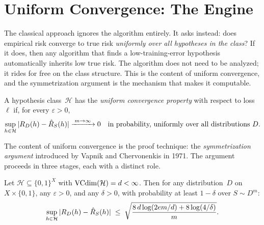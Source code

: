 
\section{Uniform Convergence: The Engine}
\label{sec:uniform-convergence}

The classical approach ignores the algorithm entirely. It asks instead: does empirical risk converge to true risk \emph{uniformly over all hypotheses in the class}? If it does, then any algorithm that finds a low-training-error hypothesis automatically inherits low true risk. The algorithm does not need to be analyzed; it rides for free on the class structure. This is the content of uniform convergence, and the symmetrization argument is the mechanism that makes it computable.

\begin{defn}
\label{def:uniform-convergence}
A hypothesis class~$\mathcal{H}$ has the \emph{uniform convergence
property} with respect to loss~$\ell$ if, for every $\varepsilon > 0$,
\[
  \sup_{h \in \mathcal{H}} |R_D(h) - \hat{R}_S(h)|
  \xrightarrow{\;m \to \infty\;} 0
  \quad \text{in probability, uniformly over all distributions } D.
\]
\end{defn}

The content of uniform convergence is the proof technique: the
\emph{symmetrization argument} introduced by Vapnik and Chervonenkis in
1971.  The argument proceeds in three stages, each with a distinct role.

\begin{thm}
\label{thm:vc-uniform}
Let $\mathcal{H} \subseteq \{0,1\}^X$ with $\mathrm{VCdim}(\mathcal{H}) = d < \infty$.
Then for any distribution~$D$ on $X \times \{0,1\}$, any $\varepsilon > 0$,
and any $\delta > 0$, with probability at least $1 - \delta$ over
$S \sim D^m$:
\[
  \sup_{h \in \mathcal{H}} |R_D(h) - \hat{R}_S(h)|
  \;\leq\; \sqrt{\frac{8\,d \log(2em/d) + 8\log(4/\delta)}{m}}.
\]
\end{thm}

